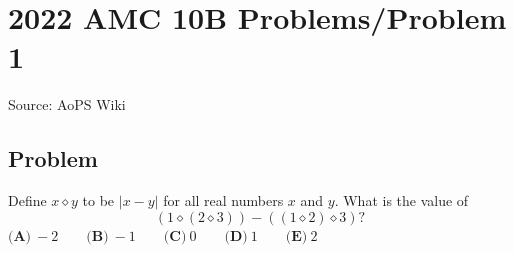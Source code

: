 \documentclass[12pt]{article}
\begin{document}
\section*{{2022 AMC 10B Problems/Problem 1}}
Source: AoPS Wiki

\subsection*{Problem}
Define $x\diamond y$ to be $|x-y|$ for all real numbers $x$ and $y.$ What is the value of \[(1\diamond(2\diamond3))-((1\diamond2)\diamond3)?\] $\textbf{(A)}\ {-}2 \qquad \textbf{(B)}\ {-}1 \qquad \textbf{(C)}\ 0 \qquad \textbf{(D)}\ 1 \qquad \textbf{(E)}\ 2$
\end{document}
